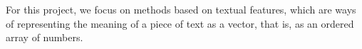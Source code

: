 \label{02_feature_based_text_classification}

For this project, we focus on \textclassification{} methods based on textual features, which are ways of representing the meaning of a piece of text as a vector, that is, as an ordered array of numbers.

